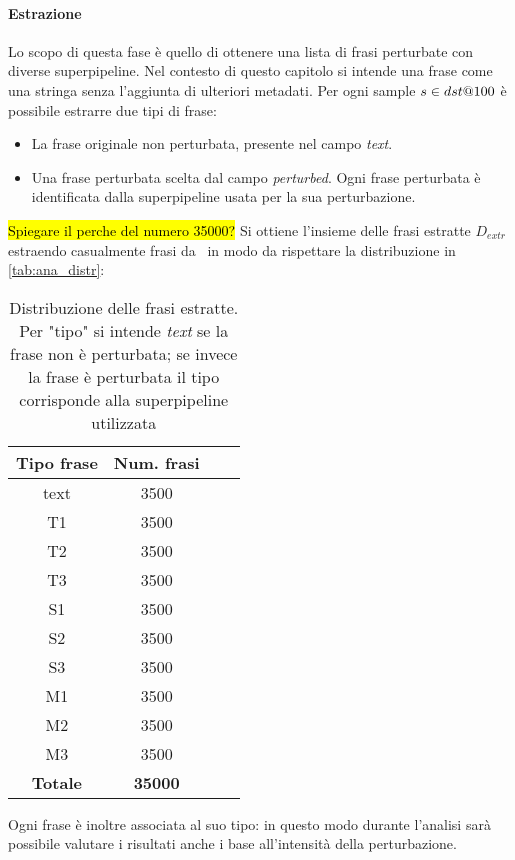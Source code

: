\paragraph{Estrazione}
Lo scopo di questa fase è quello di ottenere una lista di frasi perturbate con diverse superpipeline. Nel contesto di questo capitolo si intende una frase come una stringa senza l'aggiunta di ulteriori metadati. Per ogni sample $s \in dst@100$ è possibile estrarre due tipi di frase:
\begin{itemize}
\item La frase originale non perturbata, presente nel campo \textit{text}.
\item Una frase perturbata scelta dal campo \textit{perturbed}. Ogni frase perturbata è identificata dalla superpipeline usata per la sua perturbazione.
\end{itemize}
\hl{Spiegare il perche del numero 35000?}
Si ottiene l'insieme delle frasi estratte $D_{extr}$ estraendo casualmente frasi da \dstb\ in modo da rispettare la distribuzione in \autoref{tab:ana_distr}:
\begin{table}[H]
\centering
\begin{tabular}{cccc}
\textbf{Tipo frase} & \textbf{Num. frasi} \\
\hline
text & 3500 \\
T1 & 3500 \\
T2 & 3500 \\
T3 & 3500 \\
S1 & 3500 \\
S2 & 3500 \\
S3 & 3500 \\
M1 & 3500 \\
M2 & 3500 \\
M3 & 3500 \\ 
\hline
\textbf{Totale} & \textbf{35000}
\end{tabular}
\caption{Distribuzione delle frasi estratte. Per "tipo" si intende \textit{text} se la frase non è perturbata; se invece la frase è perturbata il tipo corrisponde alla superpipeline utilizzata}
\label{tab:ana_distr}
\end{table}
Ogni frase è inoltre associata al suo tipo: in questo modo durante l'analisi sarà possibile valutare i risultati anche i base all'intensità della perturbazione.

